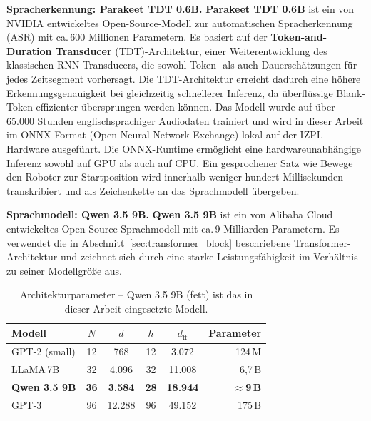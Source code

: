 \textbf{Spracherkennung: Parakeet TDT 0.6B.}\label{sec:parakeet}
\textbf{Parakeet TDT 0.6B} ist ein von NVIDIA entwickeltes
Open-Source-Modell zur automatischen Spracherkennung (ASR) mit ca.\,600 Millionen Parametern.
Es basiert auf der \textbf{Token-and-Duration Transducer} (TDT)-Architektur,
einer Weiterentwicklung des klassischen RNN-Transducers, die sowohl Token-
als auch Dauerschätzungen für jedes Zeitsegment vorhersagt. Die
TDT-Architektur erreicht dadurch eine höhere Erkennungsgenauigkeit bei
gleichzeitig schnellerer Inferenz, da überflüssige Blank-Token effizienter
übersprungen werden können.
Das Modell wurde auf über 65.000 Stunden englischsprachiger Audiodaten trainiert
und wird in dieser Arbeit im ONNX-Format (Open Neural Network Exchange) lokal
auf der IZPL-Hardware ausgeführt. Die ONNX-Runtime ermöglicht eine
hardwareunabhängige Inferenz sowohl auf GPU als auch auf CPU.
Ein gesprochener Satz wie \glqq{}Bewege den Roboter zur Startposition\grqq{}
wird innerhalb weniger hundert Millisekunden transkribiert und als Zeichenkette
an das Sprachmodell übergeben.

\textbf{Sprachmodell: Qwen 3.5 9B.}\label{sec:qwen}
\textbf{Qwen 3.5 9B} ist ein von Alibaba Cloud entwickeltes
Open-Source-Sprachmodell mit ca.\,9 Milliarden Parametern. Es verwendet
die in Abschnitt~\ref{sec:transformer_block} beschriebene
Transformer-Architektur und zeichnet sich durch eine starke
Leistungsfähigkeit im Verhältnis zu seiner Modellgröße aus.

\begin{table}[H]
    \centering
    \small
    \begin{tabular}{l c c c c r}
        \toprule
        Modell & $N$ & $d$ & $h$ & $d_{\text{ff}}$ & Parameter \\
        \midrule
        GPT-2 (small)       & 12 & 768    & 12 & 3.072   & 124\,M   \\
        LLaMA\,7B            & 32 & 4.096  & 32 & 11.008  & 6{,}7\,B \\
        \textbf{Qwen 3.5 9B} & \textbf{36} & \textbf{3.584} & \textbf{28} & \textbf{18.944} & \textbf{$\approx$9\,B} \\
        GPT-3               & 96 & 12.288 & 96 & 49.152  & 175\,B   \\
        \bottomrule
    \end{tabular}
    \caption{Architekturparameter -- Qwen 3.5 9B (fett) ist das in dieser Arbeit
        eingesetzte Modell.}
    \label{tab:modelle}
\end{table}

